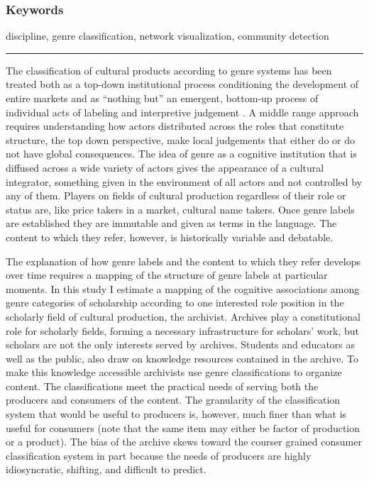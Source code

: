 \documentclass[]{book}
\theoremstyle{definition}
\theoremstyle{definition}
\theoremstyle{definition}
\theoremstyle{remark}
\begin{document}
\hypertarget{keywords-1}{%
\subsubsection*{Keywords}\label{keywords-1}}


discipline, genre classification, network visualization,
community detection

\begin{center}\rule{0.5\linewidth}{\linethickness}\end{center}

The classification of cultural products according to genre systems has
been treated both as a top-down institutional process conditioning the
development of entire markets
\citep{Lena2008Classification, Brook1994Symphonie} and as ``nothing
but'' an emergent, bottom-up process of individual acts of labeling and
interpretive judgement \citep{Lamont2010How, Hitters2010Tune}. A middle
range approach requires understanding how actors distributed across the
roles that constitute structure, the top down perspective, make local
judgements that either do or do not have global consequences. The idea
of genre as a cognitive institution that is diffused across a wide
variety of actors gives the appearance of a cultural integrator,
something given in the environment of all actors and not controlled by
any of them. Players on fields of cultural production regardless of
their role or status are, like price takers in a market, cultural name
takers. Once genre labels are established they are immutable and given
as terms in the language. The content to which they refer, however, is
historically variable and debatable.

The explanation of how genre labels and the content to which they refer
develops over time requires a mapping of the structure of genre labels
at particular moments. In this study I estimate a mapping of the
cognitive associations among genre categories of scholarship according
to one interested role position in the scholarly field of cultural
production, the archivist. Archives play a constitutional role for
scholarly fields, forming a necessary infrastructure for scholars' work,
but scholars are not the only interests served by archives. Students and
educators as well as the public, also draw on knowledge resources
contained in the archive. To make this knowledge accessible archivists
use genre classifications to organize content. The classifications meet
the practical needs of serving both the producers and consumers of the
content. The granularity of the classification system that would be
useful to producers is, however, much finer than what is useful for
consumers (note that the same item may either be factor of production or
a product). The bias of the archive skews toward the courser grained
consumer classification system in part because the needs of producers
are highly idiosyncratic, shifting, and difficult to predict.
\end{document}
